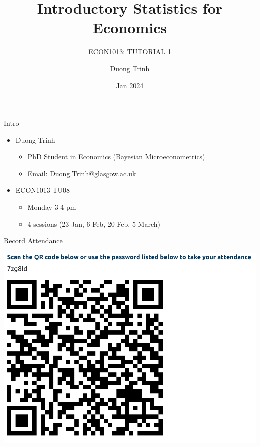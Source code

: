 \documentclass[
  11pt,
  ignorenonframetext,
]{beamer}
\title{Introductory Statistics for Economics}
\subtitle{ECON1013: TUTORIAL 1}
\author{Duong Trinh}
\date{Jan 2024}
\institute{University of Glasgow}
\providecommand{\tightlist}{%
  \setlength{\itemsep}{0pt}\setlength{\parskip}{0pt}}
\begin{document}
\frame{\titlepage}

\begin{frame}{Intro}
\protect\hypertarget{intro}{}
\begin{itemize}
\tightlist
\item
  Duong Trinh

  \begin{itemize}
  \tightlist
  \item
    PhD Student in Economics (Bayesian Microeconometrics)
  \item
    Email: \underline{Duong.Trinh@glasgow.ac.uk}
  \end{itemize}
\end{itemize}

\vspace{3mm}

\begin{itemize}
\tightlist
\item
  ECON1013-TU08

  \begin{itemize}
  \tightlist
  \item
    Monday 3-4 pm
  \item
    4 sessions (23-Jan, 6-Feb, 20-Feb, 5-March)
  \end{itemize}
\end{itemize}
\end{frame}

\begin{frame}{Record Attendance}
\protect\hypertarget{record-attendance}{}
\begin{center}\includegraphics[width=0.8\linewidth]{pictures/QRcodeAtd_TU08} \end{center}
\end{frame}
\end{document}
